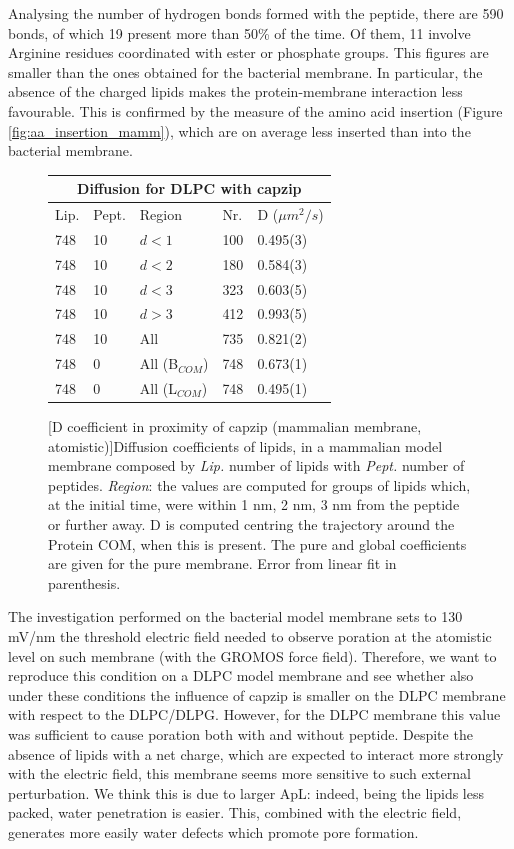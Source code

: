 Analysing the number of hydrogen bonds formed with the peptide, there are 590 bonds, of which 19 present more than 50\% of the time. Of them, 11 involve Arginine residues coordinated with ester or phosphate groups. This figures are smaller than the ones obtained for the bacterial membrane. In particular, the absence of the charged lipids makes the protein-membrane interaction less favourable. This is confirmed by the measure of the amino acid insertion (Figure \ref{fig:aa_insertion_mamm}), which are on average less inserted than into the bacterial membrane.

\begin{figure}[t!]
\centering
 \def\arraystretch{1.6}
\begin{tabular}{lllll}
 \multicolumn{5}{c}{\textbf{Diffusion for DLPC with capzip}} \\
 \hline
Lip. & Pept. & Region & Nr. & D ($\mu m^2/s$) \\
 \hline
748 & 10 & $d<1$ & 100 & 0.495(3) \\
748 & 10 & $d<2$ & 180 & 0.584(3) \\
748 & 10 & $d<3$ & 323 & 0.603(5) \\
748 & 10 & $d>3$ & 412 & 0.993(5) \\
748 & 10 & All & 735 & 0.821(2) \\
 \hline
 748 & 0 & All (B$_{COM}$) & 748 & 0.673(1) \\
 748 & 0 & All (L$_{COM}$) & 748 & 0.495(1) \\
 \hline
 \end{tabular}
[D coefficient in proximity of capzip (mammalian membrane, atomistic)]{Diffusion coefficients of lipids, in a mammalian model membrane composed by \emph{Lip.} number of lipids with \emph{Pept.} number of peptides. \emph{Region}: the values are computed for groups of lipids which, at the initial time, were within 1 nm, 2 nm, 3 nm from the peptide or further away. D is computed centring the trajectory around the Protein COM, when this is present. The pure and global coefficients are given for the pure membrane. Error from linear fit in parenthesis.}
\label{table:dlpc_D_space}
\end{figure}

The investigation performed on the bacterial model membrane sets to 130 mV/nm the threshold electric field needed to observe poration at the atomistic level on such membrane (with the GROMOS force field). Therefore, we want to reproduce this condition on a DLPC model membrane and see whether also under these conditions the influence of capzip is smaller on the DLPC membrane with respect to the DLPC/DLPG.
%
However, for the DLPC membrane this value was sufficient to cause poration both with and without peptide. Despite the absence of lipids with a net charge, which are expected to interact more strongly with the electric field, this membrane seems more sensitive to such external perturbation. We think this is due to larger ApL: indeed, being the lipids less packed, water penetration is easier. This, combined with the electric field, generates more easily water defects which promote pore formation.

